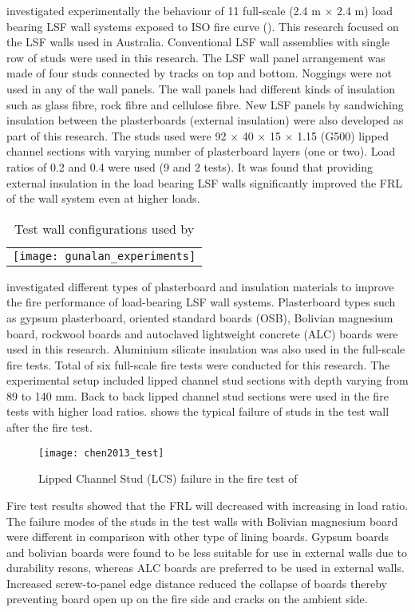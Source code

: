 \citet{Gunalan2013e} investigated experimentally the behaviour of 11 full-scale (2.4 m $\times$ 2.4 m) load bearing LSF wall systems exposed to ISO fire curve (). This research focused on the LSF walls used in Australia. Conventional LSF wall assemblies with single row of studs were used in this research. The LSF wall panel arrangement was made of four studs connected by tracks on top and bottom. Noggings were not used in any of the wall panels. The wall panels had different kinds of insulation such as glass fibre, rock fibre and cellulose fibre. New LSF panels by sandwiching insulation between the plasterboards (external insulation) were also developed as part of this research. The studs used were 92 $\times$ 40 $\times$ 15 $\times$ 1.15 (G500) lipped channel sections with varying number of plasterboard layers (one or two). Load ratios of 0.2 and 0.4 were used (9 and 2 tests). It was found that providing external insulation in the load bearing LSF walls significantly improved the FRL of the wall system even at higher loads. 
\begin{table}
	\centering
	\caption{Test wall configurations used by \citet{Gunalan2013e}}
		\begin{tabular}{c}
			\texttt{[image: gunalan\_experiments]}	
			\label{tab:gunalan_experiments}
		\end{tabular}
\end{table}

\citet{Chen2013} investigated different types of plasterboard and insulation materials to improve the fire performance of load-bearing LSF wall systems. Plasterboard types such as gypsum plasterboard, oriented standard boards (OSB), Bolivian magnesium board, rockwool boards and autoclaved lightweight concrete (ALC) boards were used in this research. Aluminium silicate insulation was also used in the full-scale fire tests. Total of six full-scale fire tests were conducted for this research. The experimental setup included lipped channel stud sections with depth varying from 89 to 140 mm. Back to back lipped channel stud sections were used in the fire tests with higher load ratios.  shows the typical failure of studs in the test wall after the fire test. 
\begin{figure}[htbp]
	\centering
		\texttt{[image: chen2013\_test]}		
		\caption{Lipped Channel Stud (LCS) failure in the fire test of \citet{Chen2013}}
		\label{fig:chen2013_test}
\end{figure}
Fire test results showed that the FRL will decreased with increasing in load ratio. The failure modes of the studs in the test walls with Bolivian magnesium board were different in comparison with other type of lining boards. Gypsum boards and bolivian boards were found to be less suitable for use in external walls due to durability resons, whereas ALC boards are preferred to be used in external walls. Increased screw-to-panel edge distance reduced the collapse of boards thereby preventing board open up on the fire side and cracks on the ambient side. 

